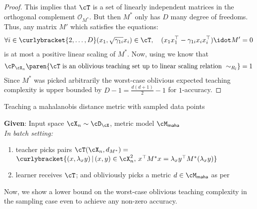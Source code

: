 \begin{proof}
This implies that $\cT$ is a set of linearly independent matrices in the orthogonal complement $\mathcal{O}_{M^*}$. But then $M^*$ only has $D$ many degree of freedoms. Thus, any matrix $M'$ which satisfies the equations:
\begin{align*}
    \forall i \in \curlybracket{2,\ldots, D} (x_1, \sqrt{\gamma_{1i}}x_i) \in \cT,\quad (x_1x_1^{\top} - \gamma_{1i}x_ix_i^{\top}) \idot M' = 0
\end{align*}
is at most a positive linear scaling of $M^*$. Now, using  we know that
\begin{align*}
    \cP_{\cX_n}\paren{ \cT \textnormal{ is an oblivious teaching set up to linear scaling relation } \sim_{R_l}} = 1
\end{align*}
Since $M^*$ was picked arbitrarily the worst-case oblivious expected teaching complexity is upper bounded by $ D - 1 = \frac{d(d+1)}{2} -1$ for $1$-accuracy.
\end{proof}

\begin{algorithm}[t]
\caption{Teaching a mahalanobis distance metric with sampled data points}
\label{alg: randmaha}
\textbf{Given}: Input space $\cX_n \sim \cD_{\cX}$, metric model $\cM_{\mathsf{maha}}$\\
\vspace{1mm}
\textit{In batch setting:}\vspace{1mm}
\begin{enumerate}
    \item teacher picks pairs $\cT(\cX_n,d_{M^*}) =$ $\curlybracket{(x,\lambda_{x}y)\,|\, (x,y) \in \cX_n^2,\, x^{\top}M^*x = \lambda_{x}y^{\top}M^*(\lambda_{x}y)}$
    \item learner receives $\cT$; and obliviously picks a metric $d \in \cM_{\mathsf{maha}}$ as per 
\end{enumerate}
\end{algorithm}

Now, we show a lower bound on the worst-case oblivious teaching complexity in the sampling case even to achieve any non-zero accuracy.



